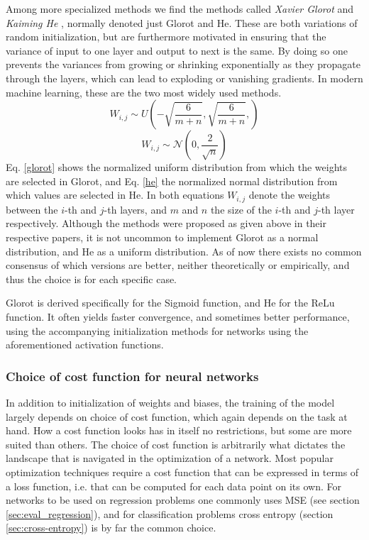 Among more specialized methods we find the methods called \textit{Xavier Glorot} \cite{Glorot} and \textit{Kaiming He} \cite{He}, normally denoted just Glorot and He. These are both variations of random initialization, but are furthermore motivated in ensuring that the variance of input to one layer and output to next is the same. By doing so one prevents the variances from growing or shrinking exponentially as they propagate through the layers, which can lead to exploding or vanishing gradients. In modern machine learning, these are the two most widely used methods.
\begin{equation}\label{glorot}
    W_{i,j} \sim U\left(-\sqrt{\frac{6}{m+n}},{\sqrt{\frac{6}{m+n}}},\right)
\end{equation}
\begin{equation}\label{he}
    W_{i,j} \sim \mathcal{N}\left(0, \frac{2}{\sqrt{n}}\right)
\end{equation}
Eq. \ref{glorot} shows the normalized uniform distribution from which the weights are selected in Glorot, and Eq. \ref{he} the normalized normal distribution from which values are selected in He. In both equations $W_{i,j}$ denote the weights between the $i$-th and $j$-th layers, and $m$ and $n$ the size of the $i$-th and $j$-th layer respectively. Although the methods were proposed as given above in their respective papers, it is not uncommon to implement Glorot as a normal distribution, and He as a uniform distribution. As of now there exists no common consensus of which versions are better, neither theoretically or empirically, and thus the choice is for each specific case.

Glorot is derived specifically for the Sigmoid function, and He for the ReLu function. It often yields faster convergence, and sometimes better performance, using the accompanying initialization methods for networks using the aforementioned activation functions. 


\subsubsection{Choice of cost function for neural networks}
In addition to initialization of weights and biases, the training of the model largely depends on choice of cost function, which again depends on the task at hand. How a cost function looks has in itself no restrictions, but some are more suited than others.
The choice of cost function is arbitrarily what dictates the landscape that is navigated in the optimization of a network. Most popular optimization techniques require a cost function that can be expressed in terms of a loss function, i.e. that can be computed for each data point on its own. 
For networks to be used on regression problems one commonly uses MSE (see section \ref{sec:eval_regression}), and for classification problems cross entropy (section \ref{sec:cross-entropy}) is by far the common choice. 

